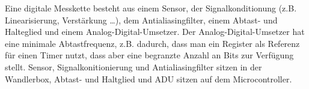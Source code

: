 \bq

Eine digitale Messkette besteht aus einem Sensor, der Signalkonditionung (z.B.
Linearisierung, Verstärkung \ldots), dem Antialiasingfilter, einem Abtast- und
Halteglied und einem Analog-Digital-Umsetzer.
Der Analog-Digital-Umsetzer hat eine minimale Abtastfrequenz, z.B. dadurch, dass
man ein Register als Referenz für einen Timer nutzt, dass aber eine begranzte
Anzahl an Bits zur Verfügung stellt.
Sensor, Signalkonitionierung und Antialiasingfilter sitzen in der Wandlerbox,
Abtast- und Haltglied und ADU sitzen auf dem Microcontroller.

\eq


